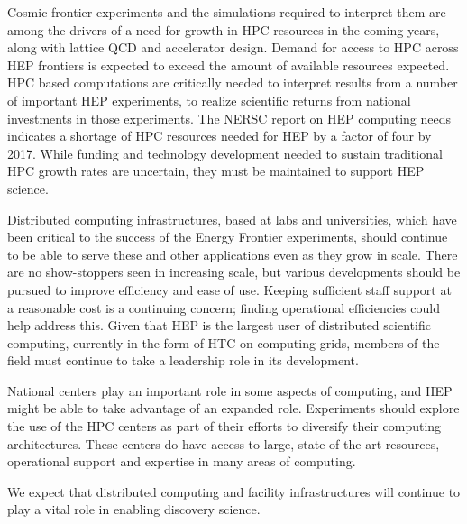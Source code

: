 Cosmic-frontier experiments and the simulations required to interpret them are among the drivers of a need for growth in HPC resources in the coming years, along with lattice QCD and accelerator design.  Demand for access to HPC across HEP frontiers is expected to exceed the amount of available resources expected.  HPC based computations are critically needed to interpret results from a number of important HEP experiments, to realize scientific returns from national investments in those experiments.  The NERSC report on HEP computing needs indicates a shortage of HPC resources needed for HEP by a factor of four by 2017.  While funding and technology development needed to sustain traditional HPC growth rates are uncertain, they must be maintained to support HEP science.

Distributed computing infrastructures, based at labs and universities, which have been critical to the success of the Energy Frontier experiments, should continue to be able to serve these and other applications even as they grow in scale.  There are no show-stoppers seen in increasing scale, but various developments should be pursued to improve efficiency and ease of use.  Keeping sufficient staff support at a reasonable cost is a continuing concern; finding operational efficiencies could help address this.  Given that HEP is the largest user of distributed scientific computing, currently in the form of HTC on computing grids, members of the field must continue to take a leadership role in its development.

National centers play an important role in some aspects of computing, and HEP might be able to take advantage of an expanded role.  Experiments should explore the use of the HPC centers as part of their efforts to diversify their computing architectures.  These centers do have access to large, state-of-the-art resources, operational support and expertise in many areas of computing.

We expect that distributed computing and facility infrastructures will continue to play a vital role in enabling discovery science.


